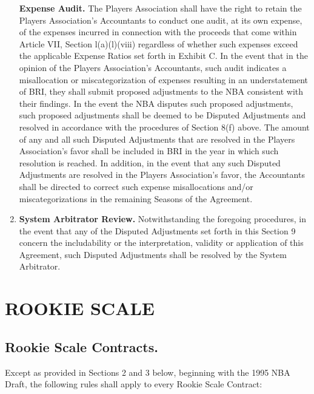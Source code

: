 \documentclass[
]{book}
\begin{document}
\begin{enumerate}
  \textbf{Expense Audit.} The Players Association shall have the right to retain the Players Association's Accountants to conduct one audit, at its own expense, of the expenses incurred in connection with the proceeds that come within Article VII, Section l(a)(l)(viii) regardless of whether such expenses exceed the applicable Expense Ratios set forth in Exhibit C. In the event that in the opinion of the Players Association's Accountants, such audit indicates a misallocation or miscategorization of expenses resulting in an understatement of BRI, they shall submit proposed adjustments to the NBA consistent with their findings. In the event the NBA disputes such proposed adjustments, such proposed adjustments shall be deemed to be Disputed Adjustments and resolved in accordance with the procedures of Section 8(f) above. The amount of any and all such Disputed Adjustments that are resolved in the Players Association's favor shall be included in BRI in the year in which such resolution is reached. In addition, in the event that any such Disputed Adjustments are resolved in the Players Association's favor, the Accountants shall be directed to correct such expense misallocations and/or miscategorizations in the remaining Seasons of the Agreement.
\item
  \textbf{System Arbitrator Review.} Notwithstanding the foregoing procedures, in the event that any of the Disputed Adjustments set forth in this Section 9 concern the includability or the interpretation, validity or application of this Agreement, such Disputed Adjustments shall be resolved by the System Arbitrator.
\end{enumerate}

\hypertarget{rookie-scale}{%
\chapter{ROOKIE SCALE}\label{rookie-scale}}

\hypertarget{rookie-scale-contracts.}{%
\section{Rookie Scale Contracts.}\label{rookie-scale-contracts.}}

Except as provided in Sections 2 and 3 below, beginning with the 1995 NBA Draft, the following rules shall apply to every Rookie Scale Contract:
\end{document}
